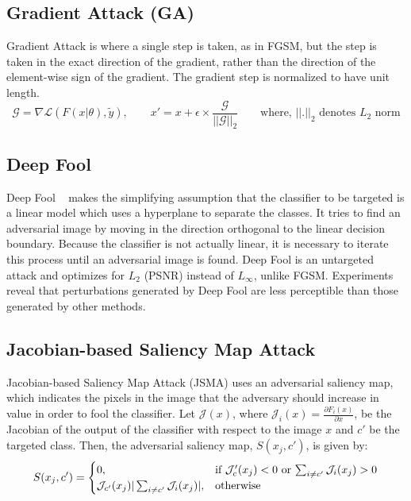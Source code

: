 \subsection{Gradient Attack (GA)} 
Gradient Attack is where a single step is taken, as in FGSM, but the step is taken in the exact direction of the gradient, rather than the direction of the element-wise sign of the gradient. The gradient step is normalized to have unit length.
\[
\mathcal{G} = \nabla \mathcal{L} (F(x|\theta),\widetilde{y}), \qquad x' = x + \epsilon \times \frac{\mathcal{G}}{\mathcal{||G||}_2} \qquad \text{where, $||.||_2$ denotes $L_2$ norm}
\]
\subsection{Deep Fool}
Deep Fool ~\cite{MoosaviDezfooli2016DeepFoolAS} makes the simplifying assumption that the classifier to be targeted is a linear model which uses a hyperplane to separate the classes.
It tries to find an adversarial image by moving in the direction orthogonal to the linear decision boundary. 
Because the classifier is not actually linear, it is necessary to iterate this process until an adversarial image is found.
Deep Fool is an untargeted attack and optimizes for $L_2$ (PSNR) instead of $L_\infty$, unlike FGSM. 
Experiments reveal that perturbations generated by Deep Fool are less perceptible than those generated by other methods.

\subsection{Jacobian-based Saliency Map Attack}
Jacobian-based Saliency Map Attack (JSMA) \cite{Carlini2017TowardsET} uses an adversarial saliency map, which indicates the pixels in the image that the adversary should increase in value in order to fool the classifier.
Let $\mathcal{J}(x)$, where  $\mathcal{J}_i(x) = \frac{\partial F_{i}(x)}{\partial x} $, be the Jacobian of the output of the classifier with respect to the image $x$ and $c'$ be the targeted class.
Then, the adversarial saliency map, $S(x_j,c')$, is given by: 
\[
 S(x_j,c') = \begin{cases} 
            0, & \text{if $\mathcal{J}_c'(x_j)<0$}$ or $\sum_{i \neq c'} \mathcal{J}_i(x_j) > 0 \\
           \mathcal{J}_{c'}(x_j) | \sum_{i \neq c'} \mathcal{J}_i(x_j) |, & \text{otherwise}
          \end{cases}
\]

